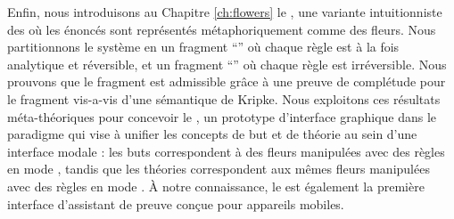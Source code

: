 Enfin, nous introduisons au Chapitre \ref{ch:flowers} le , une variante intuitionniste des  où les énoncés sont représentés métaphoriquement comme des fleurs. Nous partitionnons le système en un fragment ``'' où chaque règle est à la fois analytique et réversible, et un fragment ``'' où chaque règle est irréversible. Nous prouvons que le fragment  est admissible grâce à une preuve de complétude pour le fragment  vis-a-vis d'une sémantique de Kripke. Nous exploitons ces résultats méta-théoriques pour concevoir le , un prototype d'interface graphique dans le paradigme  qui vise à unifier les concepts de but et de théorie au sein d'une interface modale : les buts correspondent à des fleurs manipulées avec des règles  en mode , tandis que les théories correspondent aux mêmes fleurs manipulées avec des règles  en mode . À notre connaissance, le  est également la première interface d'assistant de preuve conçue pour appareils mobiles.